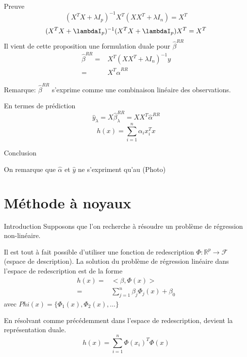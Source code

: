 \documentclass{article}
\begin{document}
Preuve
\begin{equation}
(X^TX+\lambda I_p)^{-1}X^T(XX^T+\lambda I_n)=X^T
\end{equation}
\begin{equation}
(X^TX+\lambdaI_p)^{-1}(X^TX+\lambdaI_p)X^T=X^T
\end{equation}
Il vient de cette proposition une formulation duale pour $\hat{\beta}^{RR}$
\begin{equation}
\begin{split}
\hat{\beta}^{RR}=&X^T(XX^T+\lambda I_n)^{-1}y\\
=&X^T\hat{\alpha}^{RR}
\end{split}
\end{equation}

Remarque: $\hat{\beta}^{RR}$ s'exprime comme une combinaison lin\'eaire des observations.

En termes de pr\'ediction
\begin{equation}
\hat{y}_{\lambda}=X\hat{\beta}_\lambda^{RR}=XX^T\hat{\alpha}^{RR}
\end{equation}
\begin{equation}
h(x)=\sum_{i=1}^n \alpha_i x_i^Tx
\end{equation}

Conclusion

On remarque que $\hat{\alpha}$ et $\hat{y}$ ne s'expriment qu'au
(Photo)

\section{M\'ethode \`a noyaux}
Introduction Supposons que l'on recherche \`a r\'esoudre un probl\`eme de r\'egression non-lin\'eaire.

Il est tout \`a fait possible d'utiliser une fonction de redescription $\Phi:\mathbb{R}^p\to\mathcal{F}$(espace de description).
La solution du probl\`eme de r\'egression lin\'eaire dans l'espace de redescription est de la forme 
\begin{equation}
\begin{split}
h(x)=&<\beta,\Phi(x)>\\
=&\sum_{j=1}^n\beta_j\Phi_j(x)+\beta_0
\end{split}
\end{equation}
avec $Phi(x)=\{\Phi_1(x),\Phi_2(x),\ldots\}$

En r\'esolvant comme pr\'ec\'edemment dans l'espace de redescription, devient la repr\'esentation duale.
\begin{equation}
h(x)=\sum_{i=1}^n\Phi(x_i)^T\Phi(x)
\end{equation}
\end{document}
